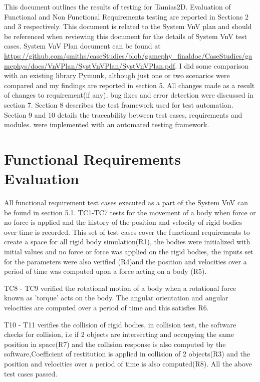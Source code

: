 \documentclass[12pt, titlepage]{article}
\newcommand{\progname}{Tamias2D}
\begin{document}
\tableofcontents

\listoftables %

\listoffigures %

\newpage


This document outlines the results of testing for \progname{}. Evaluation of Functional and Non Functional Requirements testing are reported in Sections 2 and 3 respectively. This document is related to the System VnV plan and should be referenced when reviewing this document for the details of System VnV test cases. System VnV Plan document can be found at \url{https://github.com/smiths/caseStudies/blob/gamephy_finaldoc/CaseStudies/gamephys/docs/VnVPlan/SystVnVPlan/SystVnVPlan.pdf}. I did some comparison with an existing library Pymunk, although just one or two scenarios were compared and my findings are reported in section 5. All changes made as a result of changes to requirement(if any), bug fixes and error detection were discussed in section 7. Section 8 describes the test framework used for test automation. Section 9 and 10 details the traceability between test cases, requirements and modules.
were implemented with an automated testing framework. 

\section{Functional Requirements Evaluation}
All functional requirement test cases executed as a part of the System VnV can be found in section 5.1. TC1-TC7 tests for the movement of a body when force or no force is applied and the history of the position and velocity of rigid bodies over time is recorded. This set of test cases cover the functional requirements to create a space for all rigid body simulation(R1), the bodies were initialized with initial values and no force or force was applied on the rigid bodies, the inputs set for the parameters were also verified (R4)and the position and velocities over a period of time was computed upon a force acting on a body (R5).

TC8 - TC9 verified the rotational motion of a body when a rotational force known as 'torque' acts on the body. The angular orientation and angular velocities are computed over a period of time and this satisfies R6. 

T10 - T11 verifies the collision of rigid bodies, in collision test, the software checks for collision, i.e if 2 objects are intersecting and occupying the same position in space(R7) and the collision response is also computed by the software,Coefficient of restitution is applied in collision of 2 objects(R3) and the position and velocities over a period of time is also computed(R8).
All the above test cases passed.
\end{document}

